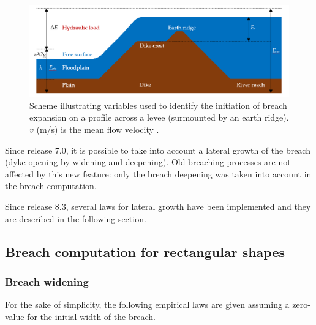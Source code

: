 \begin{figure}
\centering
\includegraphics[width=\textwidth]{./graphics/goeury2022}
\caption{Scheme illustrating variables used to identify the initiation of breach
expansion on a profile across a levee (surmounted by an earth ridge). $v$ (m/s)
is the mean flow velocity \cite{Goeury2022}.}
\label{fig:crit4+5}
\end{figure}
Since release 7.0, it is possible to take into account a lateral growth
of the breach (dyke opening by widening and deepening).
Old breaching processes are not affected by this new feature: only the breach
deepening was taken into account in the breach computation.

Since release 8.3, several laws for lateral growth have been implemented and they
are described in the following section.

\subsection{Breach computation for rectangular shapes}
\subsubsection{Breach widening}
For the sake of simplicity, the following empirical laws are given assuming a
zero-value for the initial width of the breach.


